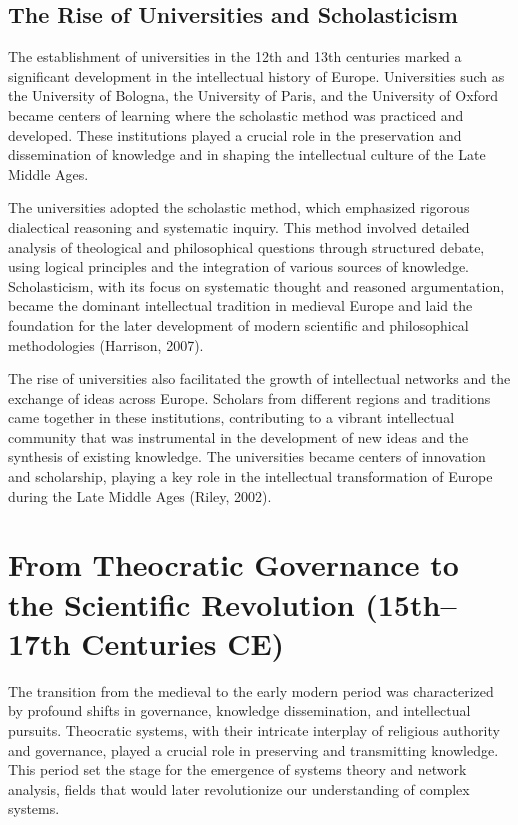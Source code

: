 \documentclass[twocolumn]{article}
\begin{document}
\subsection{The Rise of Universities and Scholasticism}

\textcolor{primary}{The establishment of universities in the 12th and 13th centuries marked a significant development in the intellectual history of Europe. Universities such as the University of Bologna, the University of Paris, and the University of Oxford became centers of learning where the scholastic method was practiced and developed. These institutions played a crucial role in the preservation and dissemination of knowledge and in shaping the intellectual culture of the Late Middle Ages.}

\textcolor{secondary}{The universities adopted the scholastic method, which emphasized rigorous dialectical reasoning and systematic inquiry. This method involved detailed analysis of theological and philosophical questions through structured debate, using logical principles and the integration of various sources of knowledge. Scholasticism, with its focus on systematic thought and reasoned argumentation, became the dominant intellectual tradition in medieval Europe and laid the foundation for the later development of modern scientific and philosophical methodologies (Harrison, 2007).}

\textcolor{primary}{The rise of universities also facilitated the growth of intellectual networks and the exchange of ideas across Europe. Scholars from different regions and traditions came together in these institutions, contributing to a vibrant intellectual community that was instrumental in the development of new ideas and the synthesis of existing knowledge. The universities became centers of innovation and scholarship, playing a key role in the intellectual transformation of Europe during the Late Middle Ages (Riley, 2002).}

\section{From Theocratic Governance to the Scientific Revolution (15th–17th Centuries CE)}

\textcolor{primary}{The transition from the medieval to the early modern period was characterized by profound shifts in governance, knowledge dissemination, and intellectual pursuits. Theocratic systems, with their intricate interplay of religious authority and governance, played a crucial role in preserving and transmitting knowledge. This period set the stage for the emergence of systems theory and network analysis, fields that would later revolutionize our understanding of complex systems.}
\end{document}
